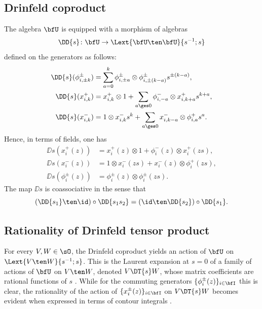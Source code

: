\documentclass[reqno]{amsart}
\numberwithin{equation}{section}
\begin{document}
\subsection{Drinfeld coproduct \cite{hernandez-05,hernandez-07, damiani-24}}
\label{ss:drinfeld-coproduct}
The algebra $\bfU$ is equipped with a morphism of algebras
\begin{equation}
\DD{s}\colon \bfU\to\Lext{\bfU\ten\bfU}{s^{-1};s}
\end{equation}
defined on the generators as follows:
\begin{equation}\label{eq:Drinfeld-generators}
	\begin{split}
	\DD{s}(\phi_{i,\pm k}^{\pm}) &= \sum_{a=0}^{k} \phi_{i,\pm a}^{\pm} \otimes \phi_{i,\pm(k-a)}^{\pm} s^{\pm(k-a)},\\
	\DD{s}(x_{i,k}^{+}) &= x_{i,k}^{+} \otimes 1 + \sum_{a \ges 0} \phi_{i,-a}^{-} \otimes x_{i,k+a}^{+} s^{k+a}, \\
	\DD{s}(x_{i,k}^{-}) &= 1\otimes x_{i,k}^{-} s^{k} + \sum_{a \ges 0} x_{i,k-a}^{-} \otimes \phi_{i,a}^{+} s^{a}.
	\end{split}
\end{equation}
Hence, in terms of fields, one has
\begin{equation}\label{eq:Drinfeld-fields}
\begin{split}
	\DD{s}(x_{i}^{+}(z)) &= x_{i}^{+}(z) \otimes 1 + \phi_{i}^{-}(z) \otimes x_{i}^{+}(zs), \\
	\DD{s}(x_{i}^{-}(z)) &= 1\otimes x_{i}^{-}(zs) + x_i^{-}(z) \otimes \phi_{i}^{+}(zs), \\
	\DD{s}(\phi_{i}^{\pm}(z)) &= \phi_{i}^{\pm}(z) \otimes \phi_{i}^{\pm}(zs).
\end{split}
\end{equation}
The map $\DD{s}$ is coassociative in the sense that
\begin{equation}\label{eq:Drinfeld-coassociative}
(\DD{s_1}\ten\id)\circ\DD{s_1s_2} = (\id\ten\DD{s_2})\circ\DD{s_1}.
\end{equation} 

\subsection{Rationality of Drinfeld tensor product \cite{hernandez-07, gautam-toledano-17}}
For every $V,W\in\sO$, the Drinfeld coproduct yields an action of $\bfU$ on 
$\Lext{V\ten W}{s^{-1};s}$. This is the Laurent expansion at $s=0$ of a family 
of actions of $\bfU$ on $V\ten W$, denoted $V\DT{s}W$, whose matrix coefficients are rational functions of $s$ \cite[Lemma~3.10]{hernandez-07}.
While for the commuting generators $\{\phi_i^\pm(z)\}_{i\in\bfI}$ this is clear, 
the rationality of the action of $\{x_{i}^{\pm}(z)\}_{i\in\bfI}$ on $V\DT{s}W$ 
becomes evident when expressed in terms of contour integrals \cite[Sec.~4.2]{gautam-toledano-17}.
\end{document}
